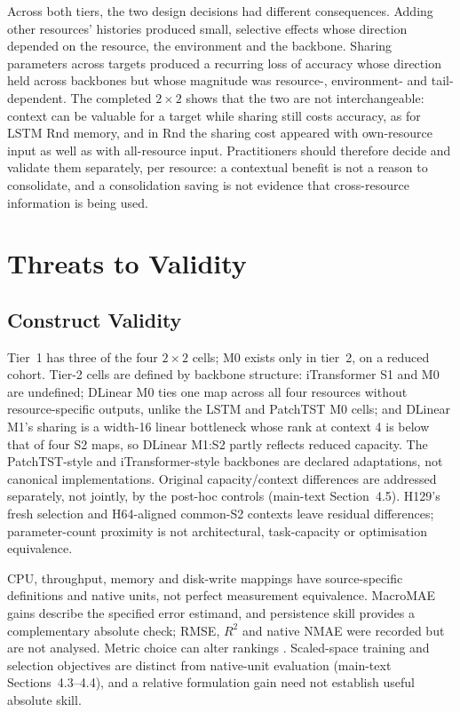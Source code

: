 \documentclass[a4paper,11pt]{article}
\begin{document}
Across both tiers, the two design decisions had different consequences.
Adding other resources' histories produced small, selective effects whose
direction depended on the resource, the environment and the backbone.
Sharing parameters across targets produced a recurring loss of accuracy
whose direction held across backbones but whose magnitude was resource-,
environment- and tail-dependent. The completed $2\times2$ shows that the two
are not interchangeable: context can be valuable for a target while sharing
still costs accuracy, as for LSTM Rnd memory, and in Rnd the sharing cost
appeared with own-resource input as well as with all-resource input. Practitioners should therefore decide
and validate them separately, per resource: a contextual benefit is not a
reason to consolidate, and a consolidation saving is not evidence that
cross-resource information is being used.

\section*{Threats to Validity}


\subsection*{Construct Validity}


Tier~1 has three of the four $2\times2$ cells; M0 exists only in tier~2,
on a reduced cohort. Tier-2 cells are defined by backbone structure:
iTransformer S1 and M0 are undefined; DLinear M0 ties one map across all
four resources without resource-specific outputs, unlike the LSTM and
PatchTST M0 cells; and DLinear M1's sharing is a width-16 linear bottleneck
whose rank at context 4 is below that of four S2 maps, so DLinear M1:S2 partly
reflects reduced capacity. The PatchTST-style and iTransformer-style
backbones are declared adaptations, not canonical implementations. Original
capacity/context differences are addressed separately, not jointly, by the
post-hoc controls (main-text Section~4.5). H129's fresh selection
and H64-aligned common-S2 contexts leave residual differences; parameter-count
proximity is not architectural, task-capacity or optimisation equivalence.

CPU, throughput, memory and disk-write mappings have source-specific
definitions and native units, not perfect measurement equivalence.
MacroMAE gains describe the specified error estimand, and persistence skill
provides a complementary absolute check; RMSE, $R^2$ and native NMAE were
recorded but are not analysed. Metric choice can
alter rankings \citep{Hyndman2006Accuracy}. Scaled-space training and selection
objectives are distinct from native-unit evaluation
(main-text Sections~4.3--4.4), and a relative
formulation gain need not establish useful absolute skill.
\end{document}
